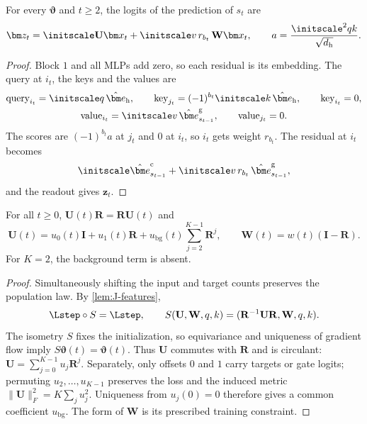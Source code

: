 \begin{lemma}
\label{lem:J-features}
For every $\bm\vartheta$ and $t\ge2$, the logits of the prediction of $s_t$ are
\[
 \bm z_t=\initscale \mathbf U\bm x_t+\initscale v\,r_{b_t}\,\mathbf W\bm x_t,\qquad a=\frac{\initscale^2qk}{\sqrt{d_{\mathrm h}}}.
\]
\end{lemma}

\begin{proof}
Block $1$ and all MLPs add zero, so each residual is its embedding. The query at $i_t$, the keys and the values are
\begin{gather*}
 \text{query}_{i_t}=\initscale q\,\hat{\bm e}_{\mathrm h},\qquad \text{key}_{j_t}=(-1)^{b_t}\initscale k\,\hat{\bm e}_{\mathrm h},\qquad \text{key}_{i_t}=0,\\
 \text{value}_{i_t}=\initscale v\,\hat{\bm e}^{\mathrm g}_{s_{t-1}},\qquad \text{value}_{j_t}=0 .
\end{gather*}
The scores are $(-1)^{b_t}a$ at $j_t$ and $0$ at $i_t$, so $i_t$ gets weight $r_{b_t}$. The residual at $i_t$ becomes
\[
 \initscale\hat{\bm e}^{\mathrm c}_{s_{t-1}}+\initscale v\,r_{b_t}\,\hat{\bm e}^{\mathrm g}_{s_{t-1}},
\]
and the readout gives $\bm z_t$.
\end{proof}

\begin{lemma}
\label{lem:J-symmetry}
For all $t\ge0$, $\mathbf U(t)\mathbf R=\mathbf R\mathbf U(t)$ and
\[
 \mathbf U(t)=u_0(t)\mathbf I+u_1(t)\mathbf R
 +u_{\mathrm{bg}}(t)\sum_{j=2}^{K-1}\mathbf R^j,\qquad
 \mathbf W(t)=w(t)(\mathbf I-\mathbf R).
\]
For $K=2$, the background term is absent.
\end{lemma}

\begin{proof}
Simultaneously shifting the input and target counts preserves the population law. By \cref{lem:J-features},
\[
 \Lstep\circ S=\Lstep,\qquad
 S(\mathbf U,\mathbf W,q,k)=(\mathbf R^{-1}\mathbf U\mathbf R,\mathbf W,q,k).
\]
The isometry $S$ fixes the initialization, so equivariance and uniqueness of gradient flow imply $S\bm\vartheta(t)=\bm\vartheta(t)$.
Thus $\mathbf U$ commutes with $\mathbf R$ and is circulant: $\mathbf U=\sum_{j=0}^{K-1}u_j\mathbf R^j$.
Separately, only offsets $0$ and $1$ carry targets or gate logits; permuting $u_2,\ldots,u_{K-1}$ preserves the loss and the
induced metric $\|\mathbf U\|_F^2=K\sum_j u_j^2$. Uniqueness from $u_j(0)=0$ therefore gives a common coefficient $u_{\mathrm{bg}}$.
The form of $\mathbf W$ is its prescribed training constraint.
\end{proof}

